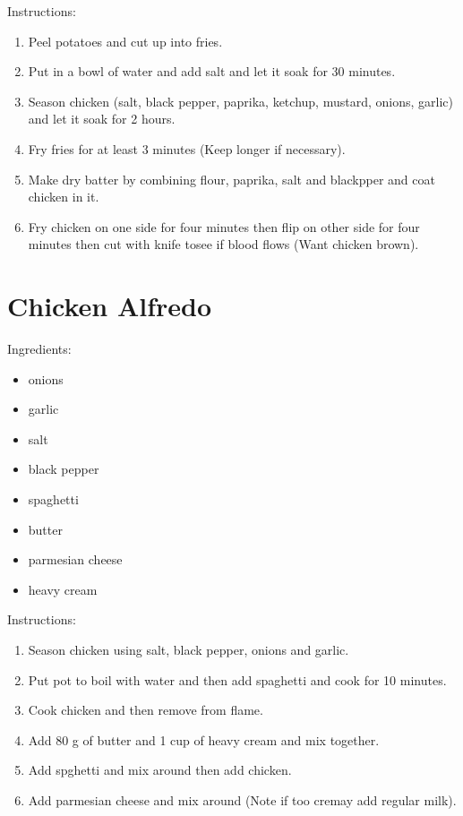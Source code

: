 \documentclass{article}
\begin{document}
Instructions:
\begin{enumerate}
    \item Peel potatoes and cut up into fries.
    \item Put in a bowl of water and add salt and let it soak for 30 minutes.
    \item Season chicken (salt, black pepper, paprika, ketchup, mustard, onions, garlic) and let it soak for 2 hours.
    \item Fry fries for at least 3 minutes (Keep longer if necessary).
    \item Make dry batter by combining flour, paprika, salt and blackpper and coat chicken in it.
    \item Fry chicken on one side for four minutes then flip on other side for four minutes then cut with knife tosee if blood flows (Want chicken brown).

\end{enumerate}
\newpage



\section{Chicken Alfredo}

Ingredients:

\begin{itemize}
    \item onions
    \item garlic
    \item salt
    \item black pepper
    \item spaghetti
    \item butter
    \item parmesian cheese
    \item heavy cream

\end{itemize}

Instructions:
\begin{enumerate}
    \item Season chicken using salt, black pepper, onions and garlic.
    \item Put pot to boil with water and then add spaghetti and cook for 10 minutes.
    \item Cook chicken and then remove from flame.
    \item Add 80 g of butter and 1 cup of heavy cream and mix together.
    \item Add spghetti and mix around then add chicken.
    \item Add parmesian cheese and mix around (Note if too cremay add regular milk).

\end{enumerate}
\end{document}
